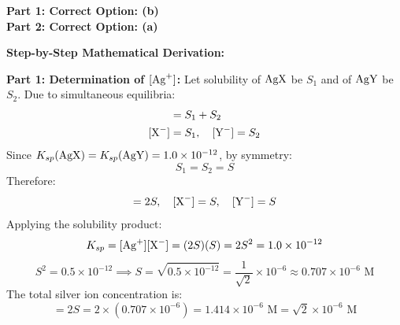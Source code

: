 \begin{solution}
\textbf{Part 1: Correct Option: (b)} \\
\textbf{Part 2: Correct Option: (a)}

\textbf{Step-by-Step Mathematical Derivation:}

\textbf{Part 1: Determination of $[\ce{Ag+}]$:}
Let solubility of $\ce{AgX}$ be $S_1$ and of $\ce{AgY}$ be $S_2$.
Due to simultaneous equilibria:
\begin{align*}
    [\ce{Ag+}] &= S_1 + S_2 \\
    [\ce{X-}] &= S_1, \quad [\ce{Y-}] = S_2
\end{align*}
Since $K_{sp}(\ce{AgX}) = K_{sp}(\ce{AgY}) = 1.0 \times 10^{-12}$, by symmetry:
\begin{equation*}
    S_1 = S_2 = S
\end{equation*}
Therefore:
\begin{equation*}
    [\ce{Ag+}] = 2S, \quad [\ce{X-}] = S, \quad [\ce{Y-}] = S
\end{equation*}
Applying the solubility product:
\begin{equation*}
    K_{sp} = [\ce{Ag+}][\ce{X-}] = (2S)(S) = 2S^2 = 1.0 \times 10^{-12}
\end{equation*}
\begin{equation*}
    S^2 = 0.5 \times 10^{-12} \implies S = \sqrt{0.5 \times 10^{-12}} = \frac{1}{\sqrt{2}} \times 10^{-6} \approx 0.707 \times 10^{-6}\text{ M}
\end{equation*}
The total silver ion concentration is:
\begin{equation*}
    [\ce{Ag+}] = 2S = 2 \times (0.707 \times 10^{-6}) = 1.414 \times 10^{-6}\text{ M} = \sqrt{2} \times 10^{-6}\text{ M}
\end{equation*}


\end{solution}
